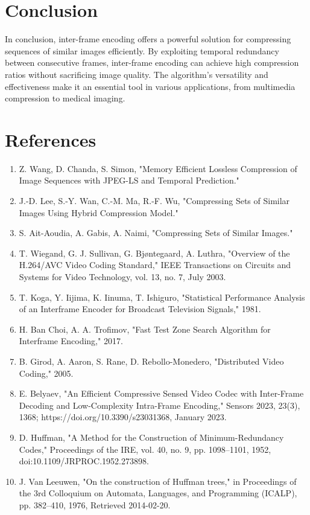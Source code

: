 \documentclass[twocolumn]{article}
\begin{document}
\section{Conclusion}
In conclusion, inter-frame encoding offers a powerful solution for compressing sequences of similar images efficiently. By exploiting temporal redundancy between consecutive frames, inter-frame encoding can achieve high compression ratios without sacrificing image quality. The algorithm's versatility and effectiveness make it an essential tool in various applications, from multimedia compression to medical imaging.

\section{References}
\begin{enumerate}
    \item Z. Wang, D. Chanda, S. Simon, "Memory Efficient Lossless Compression of Image Sequences with JPEG-LS and Temporal Prediction."
    \item J.-D. Lee, S.-Y. Wan, C.-M. Ma, R.-F. Wu, "Compressing Sets of Similar Images Using Hybrid Compression Model."
    \item S. Ait-Aoudia, A. Gabis, A. Naimi, "Compressing Sets of Similar Images."
    \item T. Wiegand, G. J. Sullivan, G. Bjøntegaard, A. Luthra, "Overview of the H.264/AVC Video Coding Standard," IEEE Transactions on Circuits and Systems for Video Technology, vol. 13, no. 7, July 2003.
    \item T. Koga, Y. Iijima, K. Iinuma, T. Ishiguro, "Statistical Performance Analysis of an Interframe Encoder for Broadcast Television Signals," 1981.
    \item H. Ban Choi, A. A. Trofimov, "Fast Test Zone Search Algorithm for Interframe Encoding," 2017.
    \item B. Girod, A. Aaron, S. Rane, D. Rebollo-Monedero, "Distributed Video Coding," 2005.
    \item E. Belyaev, "An Efficient Compressive Sensed Video Codec with Inter-Frame Decoding and Low-Complexity Intra-Frame Encoding," Sensors 2023, 23(3), 1368; https://doi.org/10.3390/s23031368, January 2023.
    \item D. Huffman, "A Method for the Construction of Minimum-Redundancy Codes," Proceedings of the IRE, vol. 40, no. 9, pp. 1098–1101, 1952, doi:10.1109/JRPROC.1952.273898.
    \item J. Van Leeuwen, "On the construction of Huffman trees," in Proceedings of the 3rd Colloquium on Automata, Languages, and Programming (ICALP), pp. 382–410, 1976, Retrieved 2014-02-20.
\end{enumerate}
\end{document}

